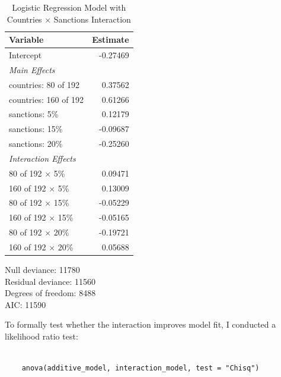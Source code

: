 \documentclass[12pt,letterpaper]{article}
\begin{document}
\begin{table}[H]
	\centering
	\begin{tabular}{lr}
		\hline
		\textbf{Variable} & \textbf{Estimate} \\
		\hline
		Intercept & -0.27469 \\
		
		\multicolumn{2}{l}{\textit{Main Effects}} \\
		
		countries: 80 of 192 & 0.37562 \\
		countries: 160 of 192 & 0.61266 \\
		
		sanctions: 5\% & 0.12179 \\
		sanctions: 15\% & -0.09687 \\
		sanctions: 20\% & -0.25260 \\
		
		\multicolumn{2}{l}{\textit{Interaction Effects}} \\
		
		80 of 192 $\times$ 5\% & 0.09471 \\
		160 of 192 $\times$ 5\% & 0.13009 \\
		
		80 of 192 $\times$ 15\% & -0.05229 \\
		160 of 192 $\times$ 15\% & -0.05165 \\
		
		80 of 192 $\times$ 20\% & -0.19721 \\
		160 of 192 $\times$ 20\% & 0.05688 \\
		\hline
	\end{tabular}
	\caption{Logistic Regression Model with Countries $\times$ Sanctions Interaction}
\end{table}

\vspace{0.3cm}

\noindent
Null deviance: 11780 \\
Residual deviance: 11560 \\
Degrees of freedom: 8488 \\
AIC: 11590



To formally test whether the interaction improves model fit, I conducted a likelihood ratio test:

\begin{BVerbatim}
	
	anova(additive_model, interaction_model, test = "Chisq")
	
\end{BVerbatim}
\end{document}
